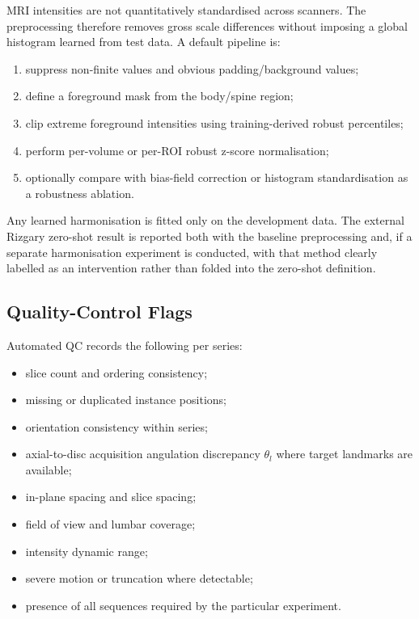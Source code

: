 MRI intensities are not quantitatively standardised across scanners. The
preprocessing therefore removes gross scale differences without imposing a
global histogram learned from test data. A default pipeline is:

\begin{enumerate}
  \item suppress non-finite values and obvious padding/background values;
  \item define a foreground mask from the body/spine region;
  \item clip extreme foreground intensities using training-derived robust
        percentiles;
  \item perform per-volume or per-ROI robust z-score normalisation;
  \item optionally compare with bias-field correction or histogram
        standardisation as a robustness ablation.
\end{enumerate}

Any learned harmonisation is fitted only on the development data. The external
Rizgary zero-shot result is reported both with the baseline preprocessing and,
if a separate harmonisation experiment is conducted, with that method clearly
labelled as an intervention rather than folded into the zero-shot definition.

\subsection{Quality-Control Flags}
\label{sec:method-qc}

Automated QC records the following per series:

\begin{itemize}
  \item slice count and ordering consistency;
  \item missing or duplicated instance positions;
  \item orientation consistency within series;
  \item axial-to-disc acquisition angulation discrepancy $\theta_l$ where
        target landmarks are available;
  \item in-plane spacing and slice spacing;
  \item field of view and lumbar coverage;
  \item intensity dynamic range;
  \item severe motion or truncation where detectable;
  \item presence of all sequences required by the particular experiment.
\end{itemize}

